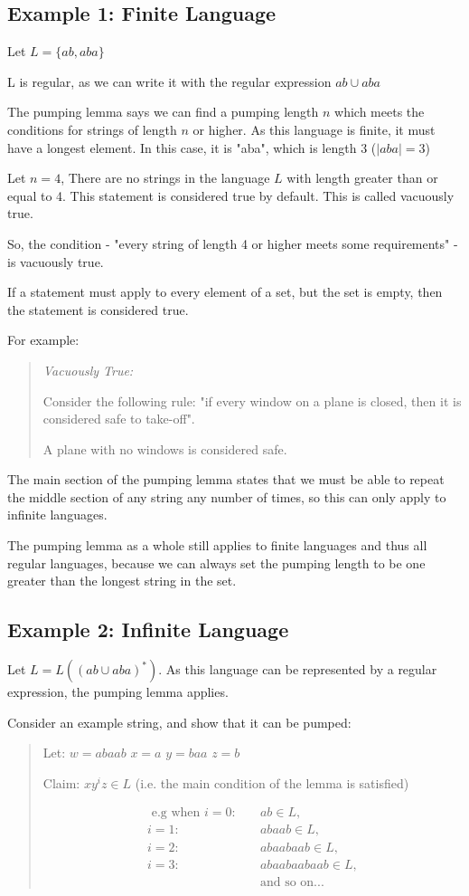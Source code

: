 \documentclass[11pt]{article}
\begin{document}
\subsection{Example 1: Finite Language}
Let $L = \{ab, aba\}$

L is regular, as we can write it with the regular expression $ab \cup aba$

The pumping lemma says we can find a pumping length $n$ which meets the
conditions for strings of length $n$ or higher. As this language is finite, it
must have a longest element. In this case, it is "aba", which is length 3 
($|aba| = 3$)

Let $n = 4$, There are no strings in the language $L$ with length greater than
or equal to 4. This statement is considered true by default. This is called
vacuously true.

So, the condition - "every string of length 4 or higher meets some requirements"
- is vacuously true.

If a statement must apply to every element of a set, but the set is empty, then
the statement is considered true.

For example:
\begin{quote}
	\itshape
	Vacuously True:

	Consider the following rule: "if every window on a plane is closed, then it is
	considered safe to take-off".

	A plane with no windows is considered safe.
\end{quote}

The main section of the pumping lemma states that we must be able to repeat the
middle section of any string any number of times, so this can only apply to
infinite languages.

The pumping lemma as a whole still applies to finite languages and thus all
regular languages, because we can always set the pumping length to be one
greater than the longest string in the set.

\subsection{Example 2: Infinite Language}
Let $L = L((ab \cup aba)^\ast)$. As this language can be represented by a
regular expression, the pumping lemma applies.

Consider an example string, and show that it can be pumped:
\begin{quote}
	Let: $w=abaab$ $x=a$ $y=baa$ $z=b$

	Claim: $xy^iz \in L$ (i.e. the main condition of the lemma is satisfied)

	\begin{align*}
		\text{ e.g when } i=0:\quad &ab \in L,\\
		i=1:\quad &abaab \in L,\\
		i=2:\quad &abaabaab \in L, \\
		i=3:\quad &abaabaabaab \in L,\\
		&\text{and so on... }
	\end{align*}
\end{quote}
\end{document}
